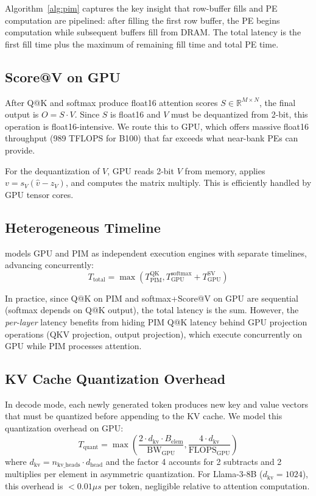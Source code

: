 Algorithm~\ref{alg:pim} captures the key insight that row-buffer fills and PE computation are pipelined: after filling the first row buffer, the PE begins computation while subsequent buffers fill from DRAM.
The total latency is the first fill time plus the maximum of remaining fill time and total PE time.

\subsection{Score@V on GPU}

After Q@K and softmax produce float16 attention scores $S \in \mathbb{R}^{M \times N}$, the final output is $O = S \cdot V$.
Since $S$ is float16 and $V$ must be dequantized from 2-bit, this operation is float16-intensive.
We route this to GPU, which offers massive float16 throughput (989 TFLOPS for B100) that far exceeds what near-bank PEs can provide.

For the dequantization of $V$, GPU reads 2-bit $V$ from memory, applies $v = s_V(\hat{v} - z_V)$, and computes the matrix multiply.
This is efficiently handled by GPU tensor cores.

\subsection{Heterogeneous Timeline}

\pimattn{} models GPU and PIM as independent execution engines with separate timelines, advancing concurrently:
\begin{equation}
T_{\text{total}} = \max(T_{\text{PIM}}^{\text{QK}}, T_{\text{GPU}}^{\text{softmax}} + T_{\text{GPU}}^{\text{SV}})
\end{equation}

In practice, since Q@K on PIM and softmax+Score@V on GPU are sequential (softmax depends on Q@K output), the total latency is the sum.
However, the \emph{per-layer} latency benefits from hiding PIM Q@K latency behind GPU projection operations (QKV projection, output projection), which execute concurrently on GPU while PIM processes attention.


\subsection{KV Cache Quantization Overhead}

In decode mode, each newly generated token produces new key and value vectors that must be quantized before appending to the KV cache.
We model this quantization overhead on GPU:
\begin{equation}
T_{\text{quant}} = \max\left(\frac{2 \cdot d_{\text{kv}} \cdot B_{\text{elem}}}{\text{BW}_{\text{GPU}}}, \frac{4 \cdot d_{\text{kv}}}{\text{FLOPS}_{\text{GPU}}}\right)
\end{equation}
where $d_{\text{kv}} = n_{\text{kv\_heads}} \cdot d_{\text{head}}$ and the factor 4 accounts for 2 subtracts and 2 multiplies per element in asymmetric quantization.
For Llama-3-8B ($d_{\text{kv}}=1024$), this overhead is $<0.01\mu s$ per token, negligible relative to attention computation.
